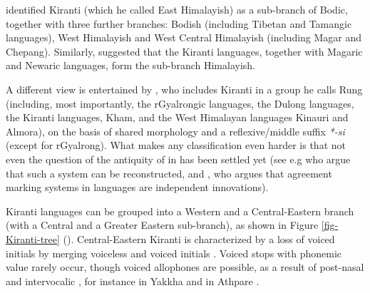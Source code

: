 \citet{Shafer1974_Introduction} identified Kiranti (which he called East Himalayish) as a sub-branch of Bodic, together with three further branches: Bodish (including Tibetan and Tamangic languages), West Himalayish and West Central Himalayish (including Magar and Chepang). Similarly, \citet{Bradley1997_Tibeto-Burman} suggested that the Kiranti languages, together with Magaric and Newaric languages, form the sub-branch Himalayish. 

A different view is entertained by \citet{LaPolla2003_Overview},  who includes Kiranti in a group he calls Rung (including, most importantly, the rGyalrongic languages, the Dulong languages, the Kiranti languages,  Kham, and the West Himalayan languages Kinauri and Almora), on the basis of shared  morphology and a reflexive/middle suffix \emph{*-si} (except for rGyalrong).  What makes any classification even harder is that not even the question of the antiquity of  in  has been settled yet (see e.g \citet{DeLancey2010_Towards, Jacques2012_Agreement} who argue that such a system can be reconstructed, and \citet{LaPolla2001_Role, LaPolla2012_Comments}, who argues that agreement marking systems in  languages are independent innovations).

Kiranti languages can be grouped into a Western and a Central-Eastern branch (with a Central and a Greater Eastern sub-branch), as shown in Figure \ref{fig-Kiranti-tree} (\citealt{Bickeletal_Firstperson}). Central-Eastern Kiranti is characterized by a loss of voiced initials by merging voiceless and voiced initials \citep{Michailovsky1994Manner}. Voiced stops with phonemic value rarely occur, though voiced allophones are possible, as a result of post-nasal and intervocalic , for instance in Yakkha and in Athpare \citep[505]{Ebert2003Kiranti}. 


